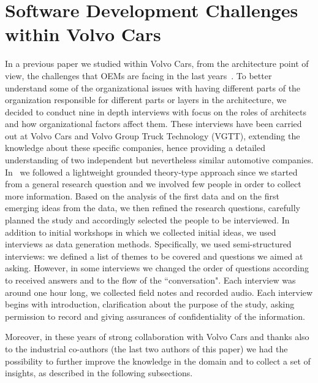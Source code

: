 \section{Software Development Challenges within Volvo Cars}\label{sec:lessonsLearned}

In a previous paper we studied within Volvo Cars,
from the architecture point of view,
the challenges that OEMs are facing in the last years~\cite{WICSA2015}. 
To better understand some of the
organizational issues with having different parts of the organization responsible for different parts or layers in the architecture, we decided to conduct nine in depth interviews with
focus on the roles of architects and how organizational factors affect them.
These interviews have been carried out at Volvo Cars  and Volvo Group Truck Technology
(VGTT), extending the knowledge about these specific companies, hence providing a detailed understanding of two independent but nevertheless similar automotive companies. %
In~\cite{WICSA2015} we 
followed a lightweight grounded theory-type approach since we started from a general research question and we involved few people in order to collect more information. Based on the analysis of the first data and on the first emerging ideas from the data, we then refined the research questions, carefully planned the study and accordingly selected the people to be interviewed. 
In addition to initial workshops in which we collected initial ideas, we used interviews as data generation methods. Specifically, we used semi-structured interviews: we defined a list of themes to be covered and questions we aimed at asking. However, in some interviews we changed the order of questions according to received answers and to the flow of the ``conversation". 
Each interview was around one hour long, we collected field notes and recorded audio. Each interview begins with introduction, clarification about the purpose of the study, asking permission to record and giving assurances of confidentiality of the information.  

Moreover, in these years of strong collaboration with Volvo Cars and thanks also to the industrial co-authors (the last two authors of this paper) we had the possibility to further improve the knowledge in the domain and to collect a set of insights, as described in the following subsections.

